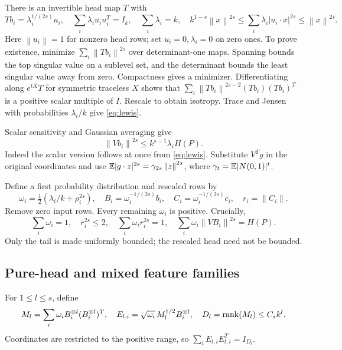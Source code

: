 \documentclass[11pt]{article}
\theoremstyle{remark}\newtheorem{remark}[theorem]{Remark}
\newcommand{\norm}[1]{\left\|#1\right\|}\newcommand{\ip}[2]{\left\langle #1,#2\right\rangle}
\begin{document}
There is an invertible head map $T$ with
\begin{equation}\label{eq:lewis}
 Tb_i=\lambda_i^{1/(2s)}u_i,\quad
 \sum_i\lambda_i u_iu_i^T=I_k,\quad \sum_i\lambda_i=k,\quad
 k^{1-s}\norm x^{2s}\le\sum_i\lambda_i|u_i\cdot x|^{2s}\le\norm x^{2s}.
\end{equation}
Here $\norm{u_i}=1$ for nonzero head rows; set $u_i=0,\lambda_i=0$ on zero ones. To prove existence, minimize $\sum_i\norm{Tb_i}^{2s}$ over determinant-one maps. Spanning bounds the top singular value on a sublevel set, and the determinant bounds the least singular value away from zero. Compactness gives a minimizer. Differentiating along $e^{tX}T$ for symmetric traceless $X$ shows that $\sum_i\norm{Tb_i}^{2s-2}(Tb_i)(Tb_i)^T$ is a positive scalar multiple of $I$. Rescale to obtain isotropy. Trace and Jensen with probabilities $\lambda_i/k$ give \eqref{eq:lewis}.

Scalar sensitivity and Gaussian averaging give
\begin{equation}\label{eq:head-sensitivity}
 \norm{Vb_i}^{2s}\le k^{s-1}\lambda_i H(P).
\end{equation}
Indeed the scalar version follows at once from \eqref{eq:lewis}. Substitute $V^Tg$ in the original coordinates and use $\E|g\cdot z|^{2s}=\gamma_{2s}\norm z^{2s}$, where $\gamma_t=\mathbb E|N(0,1)|^t$.

Define a first probability distribution and rescaled rows by
\begin{equation}\label{eq:omega}
 \omega_i=\tfrac12(\lambda_i/k+\rho_i^{2s}),\quad
 B_i=\omega_i^{-1/(2s)}b_i,\quad C_i=\omega_i^{-1/(2s)}c_i,\quad r_i=\norm{C_i}.
\end{equation}
Remove zero input rows. Every remaining $\omega_i$ is positive. Crucially,
\begin{equation}\label{eq:bounded-tail}
 \sum_i\omega_i=1,\quad r_i^{2s}\le2,\quad
 \sum_i\omega_i r_i^{2s}=1,\quad
 \sum_i\omega_i\norm{VB_i}^{2s}=H(P).
\end{equation}
Only the tail is made uniformly bounded; the rescaled head need not be bounded.

\subsection{Pure-head and mixed feature families}
For $1\le l\le s$, define
\begin{equation}\label{eq:E}
 M_l=\sum_i\omega_i B_i^{\otimes l}(B_i^{\otimes l})^T,\quad
 E_{l,i}=\sqrt{\omega_i}\,M_l^{\dagger/2}B_i^{\otimes l},\quad D_l=\operatorname{rank}(M_l)\le C_s k^l.
\end{equation}
Coordinates are restricted to the positive range, so $\sum_iE_{l,i}E_{l,i}^T=I_{D_l}$.
\end{document}
